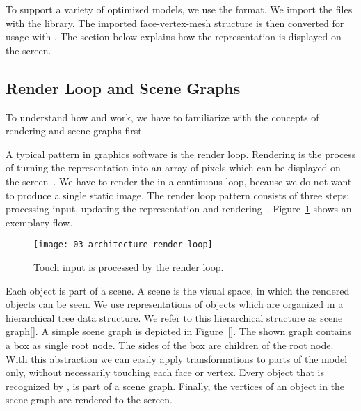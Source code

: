 \documentclass[../03-Architecture.tex]{subfiles}
\begin{document}
To support a variety of {\threedprinter} optimized models, we use the
{\stlfile} format. We import the files with the {\meshlib} library.
The imported face-vertex-mesh structure is then converted for usage
with {\threejs}. The section below explains how the {\threejs}
representation is displayed on the screen.

\subsection{Render Loop and Scene Graphs}
\label{sub:render-and-graph}

To understand how {\convertify} and {\platener} work, we have to
familiarize with the concepts of rendering and scene graphs first.

A typical pattern in graphics software is the render loop.
Rendering is the process of turning the {\threedmodel}
representation into an array of pixels which can be
displayed on the screen~\cite[p.~2]{intro-cg}. We have to
render the {\threedmodel} in a continuous loop, because we
do not want to produce a single static image. The render
loop pattern consists of three steps: processing input,
updating the {\threedmodel} representation and
rendering~\cite{gamedev-gameloop}.
Figure~\ref{fig:render-loop} shows an exemplary flow.

\begin{figure}[h]
  \centering
  \texttt{[image: 03-architecture-render-loop]}
  \caption{Touch input is processed by the render loop.}
  \label{fig:render-loop}
\end{figure}

Each object is part of a scene. A scene is the visual space, in which
the rendered objects can be seen. We use representations of objects
which are organized in a hierarchical tree data structure. We refer to
this hierarchical structure as scene graph\ref{}. A simple scene graph is depicted in
Figure~\ref{}. The shown graph contains a box as single root node. The
sides of the box are children of the root node. With this abstraction
we can easily apply transformations to parts of the model only,
without necessarily touching each face or vertex. Every object that
is recognized by {\convertify}, is part of a scene graph. Finally, the
vertices of an object in the scene graph are rendered to the screen.
\end{document}

